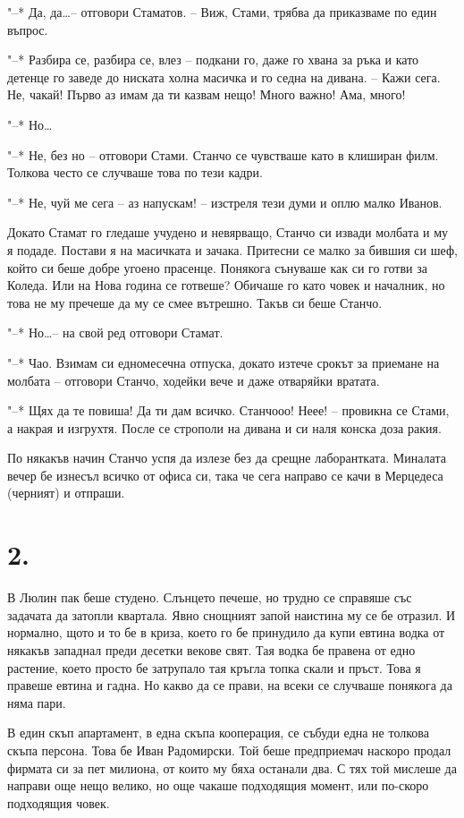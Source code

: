 \documentclass[ebook,openany,12pt]{memoir}
\begin{document}
"--* Да, да\ldots – отговори Стаматов. – Виж, Стами, тря\-бва да приказваме по един въпрос.

"--* Разбира се, разбира се, влез – подкани го, даже го хвана за ръка и като детенце го заведе до ниската холна масичка и го седна на дивана. – Кажи сега. Не, чакай! Първо аз имам да ти казвам нещо! Много важно! Ама, много!

"--* Но\ldots

"--* Не, без но – отговори Стами. Станчо се чувстваше като в клиширан филм. Толкова често се случваше това по тези кадри.

"--* Не, чуй ме сега – аз напускам! – изстреля тези думи и оплю малко Иванов.

Докато Стамат го гледаше учудено и невярващо, Ста\-нчо си извади молбата и му я подаде. Постави я на масичката и зачака. Притесни се малко за бившия си шеф, който си беше добре угоено прасенце. Понякога сънуваше как си го готви за Коледа. Или на Нова година се готвеше? Обичаше го като човек и началник, но това не му пречеше да му се смее вътрешно. Такъв си беше Станчо.

"--* Но\ldots – на свой ред отговори Стамат.

"--* Чао. Взимам си едномесечна отпуска, докато изтече срокът за приемане на молбата – отговори Станчо, ходейки вече и даже отваряйки вратата. 

"--* Щях да те повиша! Да ти дам всичко. Станчооо! Неее! – провикна се Стами, а накрая и изгрухтя. После се строполи на дивана и си наля конска доза ракия.

По някакъв начин Станчо успя да излезе без да срещне лаборантката. Миналата вечер бе изнесъл всичко от офиса си, така че сега направо се качи в Мерцедеса (черният) и отпраши.

\section*{2.}

В Люлин пак беше студено. Слънцето печеше, но трудно се справяше със задачата да затопли квартала. Явно снощният запой наистина му се бе отразил. И нормално, щото и то бе в криза, което го бе принудило да купи евтина водка от някакъв западнал преди десетки векове свят. Тая водка бе правена от едно растение, което просто бе затрупало тая кръгла топка скали и пръст. Това я правеше евтина и гадна. Но какво да се прави, на всеки се случваше понякога да няма пари.

В един скъп апартамент, в една скъпа кооперация, се събуди една не толкова скъпа персона. Това бе Иван Радомирски. Той беше предприемач наскоро продал фирмата си за пет милиона, от които му бяха останали два. С тях той мислеше да направи още нещо велико, но още чакаше подходящия момент, или по-скоро подходящия човек. 
\end{document}

